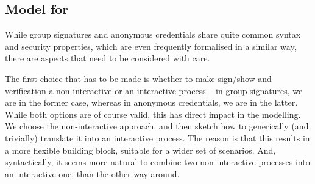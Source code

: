 \subsection{Model for \GSAC}
\label{ssec:model-gsac}

While group signatures and anonymous credentials share quite common syntax and
security properties, which are even frequently formalised in a similar way,
there are aspects that need to be considered with care.

The first choice that has to be made is whether to make sign/show and
verification a non-interactive or an interactive process -- in group signatures,
we are in the former case, whereas in anonymous credentials, we are in the
latter. While both options are of course valid, this has direct impact in the
modelling. We choose the non-interactive approach, and then sketch how to
generically (and trivially) translate it into an interactive process. The reason
is that this results in a more flexible building block, suitable for a wider set
of scenarios. And, syntactically, it seems more natural to combine two
non-interactive processes into an interactive one, than the other way around.

